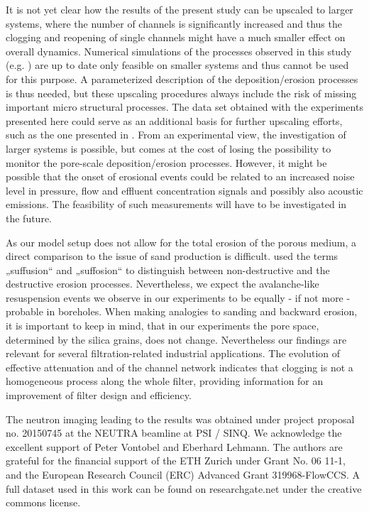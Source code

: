 \documentclass[smallextended]{svjour3}       %
\begin{document}
It is not yet clear how the results of the present study can be upscaled to larger systems, where the number of channels is significantly increased and thus the clogging and reopening of single channels might have a much smaller effect on overall dynamics. Numerical simulations of the processes observed in this study (e.g. \cite{Jaeger-etal_2017}) are up to date only feasible on smaller systems and thus cannot be used for this purpose. A parameterized description of the deposition/erosion processes is thus needed, but these upscaling procedures always include the risk of missing important micro structural processes. The data set obtained with the experiments presented here could serve as an additional basis for further upscaling efforts, such as the one presented in \cite{frishfelds-etal-2011}. From an experimental view, the investigation of larger systems is possible, but comes at the cost of losing the possibility to monitor the pore-scale deposition/erosion processes. However, it might be possible that the onset of erosional events could be related to an increased noise level in pressure, flow and effluent concentration signals and possibly also acoustic emissions. The feasibility of such measurements will have to be investigated in the future.

As our model setup does not allow for the total erosion of the porous medium, a direct comparison to the issue of sand production is difficult. \cite{Fannin2014} used the terms „suffusion“ and „suffosion“  to distinguish between non-destructive and the destructive erosion processes. Nevertheless, we expect the avalanche-like resuspension events we observe in our experiments to be equally - if not more - probable in boreholes. When making analogies to sanding and backward erosion, it is important to keep in mind, that in our experiments the pore space, determined by the silica grains, does not change. Nevertheless our findings are relevant for several filtration-related industrial applications. The evolution of effective attenuation and of the channel network indicates that clogging is not a homogeneous process along the whole filter, providing information for an improvement of filter design and efficiency.

\begin{acknowledgements}
The neutron imaging leading to the results was obtained under project proposal no. 20150745 at the NEUTRA beamline at PSI / SINQ. We acknowledge the excellent support of Peter Vontobel and Eberhard Lehmann. The authors are grateful for the financial support of the ETH Zurich under Grant No. 06 11-1, and the European Research Council (ERC) Advanced Grant 319968-FlowCCS. A full dataset used in this work can be found on researchgate.net under the creative commons license.
\end{acknowledgements}

\end{document}
